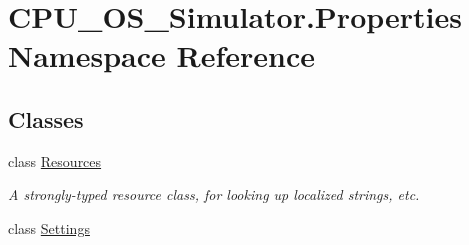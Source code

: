 \hypertarget{namespace_c_p_u___o_s___simulator_1_1_properties}{}\section{C\+P\+U\+\_\+\+O\+S\+\_\+\+Simulator.\+Properties Namespace Reference}
\label{namespace_c_p_u___o_s___simulator_1_1_properties}
\subsection*{Classes}
\begin{DoxyCompactItemize}
\item 
class \hyperlink{class_c_p_u___o_s___simulator_1_1_properties_1_1_resources}{Resources}
\begin{DoxyCompactList}\small\item\em A strongly-\/typed resource class, for looking up localized strings, etc. \end{DoxyCompactList}\item 
class \hyperlink{class_c_p_u___o_s___simulator_1_1_properties_1_1_settings}{Settings}
\end{DoxyCompactItemize}
